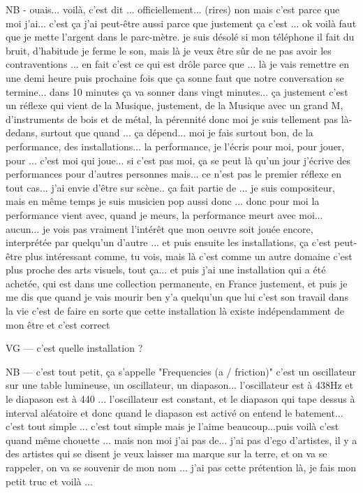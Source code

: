 NB - ouais... voilà, c'est dit ... officiellement... (rires) non mais c'est parce que moi j'ai... c'est ça j'ai peut-être aussi parce que justement ça c'est ... ok voilà faut que je mette l'argent dans le parc-mètre. je suis désolé si mon téléphone il fait du bruit, d'habitude je ferme le son,  mais là je veux être sûr de ne pas avoir les contraventions ... en fait c'est ce qui est drôle parce que ... là je vais remettre en une demi heure puis prochaine fois que ça sonne faut que notre conversation se termine... dans 10 minutes ça va sonner dans vingt minutes... ça justement c'est un réflexe qui vient de la Musique, justement, de la Musique avec un grand M, d'instruments de bois et de métal, la pérennité donc moi je suis tellement pas là-dedans, surtout que quand ... ça dépend... moi je fais surtout bon, de la performance, des installations... la performance, je l'écris pour moi, pour jouer, pour ... c'est moi qui joue... si c'est pas moi, ça se peut là qu'un jour j'écrive des performances pour d'autres personnes mais... ce n'est pas le premier réflexe en tout cas...  j'ai envie d'être sur scène..  ça fait partie de ... je suis compositeur, mais  en même temps je suis musicien pop aussi donc ... donc pour moi la performance vient avec, quand je meurs, la performance meurt avec moi... aucun... je vois pas vraiment l'intérêt que mon oeuvre soit jouée encore, interprétée par quelqu'un d'autre ... et puis ensuite les installations, ça c'est peut-être plus intéressant comme, tu vois, mais là c'est comme un autre domaine c'est plus proche des arts visuels, tout ça... et puis j'ai une installation qui a été achetée, qui est dans une collection permanente, en France justement, et puis je me dis que quand je vais mourir ben y'a quelqu'un que lui c'est son travail dans la vie c'est de faire en sorte que cette installation là existe indépendamment de mon être et c'est correct 

VG — c'est quelle installation ?

NB — c'est tout petit, ça s'appelle "Frequencies (a / friction)"  c'est un oscillateur sur une table lumineuse, un oscillateur, un diapason... l'oscillateur est à 438Hz et le diapason est à 440 ... l'oscillateur est constant, et le diapason qui tape dessus à interval aléatoire et donc quand le diapason est activé on entend le batement... c'est tout simple ... c'est tout simple mais je l'aime beaucoup...puis voilà c'est quand même chouette ... mais non moi j'ai pas de... j'ai pas d'ego d'artistes, il y a des artistes qui se disent je veux laisser ma marque sur la terre, et on va se rappeler, on va se souvenir de mon nom ... j'ai pas cette prétention là, je fais mon petit truc et voilà ...


